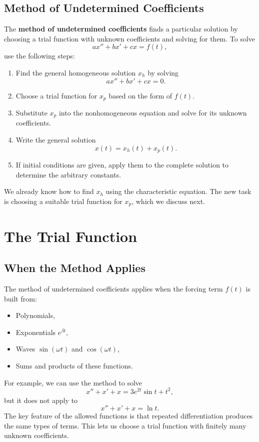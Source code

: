 \documentclass[10pt,letterpaper]{article}
\begin{document}
\subsection{Method of Undetermined Coefficients}

The \textbf{method of undetermined coefficients} finds a
particular solution by choosing a trial function with unknown
coefficients and solving for them. To solve
\[
ax''+bx'+cx=f(t),
\]
use the following steps:
\begin{enumerate}
    \item Find the general homogeneous solution $x_h$ by solving
    \[
    ax''+bx'+cx=0.
    \]

    \item Choose a trial function for $x_p$ based on the form
    of $f(t)$. 

    \item Substitute $x_p$ into the nonhomogeneous equation
    and solve for its unknown coefficients.

    \item Write the general solution
    \[
    x(t)=x_h(t)+x_p(t).
    \]

    \item If initial conditions are given, apply them to the
    complete solution to determine the arbitrary constants.
\end{enumerate}

We already know how to find $x_h$ using the characteristic
equation. The new task is choosing a suitable trial function
for $x_p$, which we discuss next. 



\section{The Trial Function}

\subsection{When the Method Applies}

The method of undetermined coefficients applies when the forcing
term $f(t)$ is built from:
\begin{itemize}
    \item Polynomials,
    \item Exponentials $e^{\beta t}$,
    \item Waves $\sin(\omega t)$ and $\cos(\omega t)$,
    \item Sums and products of these functions.
\end{itemize}
For example, we can use the method to solve
\[
x''+x'+x=3e^{2t}\sin t+t^2,
\]
but it does not apply to
\[
x''+x'+x=\ln t.
\]
The key feature of the allowed functions is that repeated
differentiation produces the same types of terms. This lets
us choose a trial function with finitely many unknown coefficients.
\end{document}

